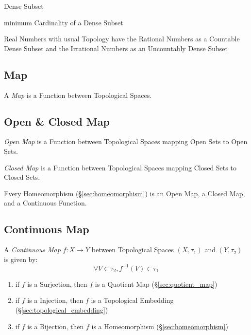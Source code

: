Dense Subset

minimum Cardinality of a Dense Subset

Real Numbers with usual Topology have the Rational Numbers as a Countable Dense
Subset and the Irrational Numbers as an Uncountably Dense Subset



\subsection{Map}\label{sec:topology_map}

A \emph{Map} is a Function between Topological Spaces.



\subsection{Open \& Closed Map}\label{sec:open_closed_map}

\emph{Open Map} is a Function between Topological Spaces mapping Open
Sets to Open Sets.

\emph{Closed Map} is a Function between Topological Spaces mapping Closed
Sets to Closed Sets.

Every Homeomorphism (\S\ref{sec:homeomorphism}) is an Open Map, a
Closed Map, and a Continuous Function.



\subsection{Continuous Map}\label{sec:continuous_map}

A \emph{Continuous Map} $f : X \rightarrow Y$ between Topological
Spaces $(X,\tau_1)$ and $(Y,\tau_2)$ is given by:
\[
  \forall V \in \tau_2, f^{-1}(V) \in \tau_1
\]

\begin{enumerate}
  \item if $f$ is a Surjection, then $f$ is a Quotient Map
    (\S\ref{sec:quotient_map})
  \item if $f$ is a Injection, then $f$ is a Topological Embedding
    (\S\ref{sec:topological_embedding})
  \item if $f$ is a Bijection, then $f$ is a Homeomorphism
    (\S\ref{sec:homeomorphism})
\end{enumerate}

